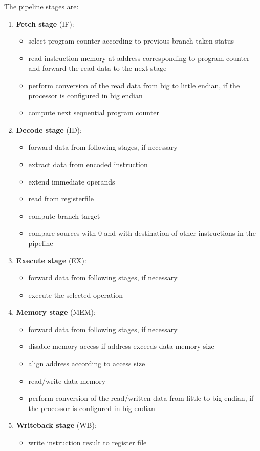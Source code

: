 \bigskip
The pipeline stages are:
\begin{enumerate}
	\item \textbf{Fetch stage} (IF):
		\begin{itemize}
			\item select program counter according to previous branch
				taken status
			\item read instruction memory at address corresponding
				to program counter and forward the read data to
				the next stage
			\item perform conversion of the read data from big to
				little endian, if the processor is configured in
				big endian
			\item compute next sequential program counter
		\end{itemize}
	\item \textbf{Decode stage} (ID):
		\begin{itemize}
			\item forward data from following stages, if necessary
			\item extract data from encoded instruction
			\item extend immediate operands
			\item read from registerfile
			\item compute branch target
			\item compare sources with 0 and with destination of
				other instructions in the pipeline
		\end{itemize}
	\item \textbf{Execute stage} (EX):
		\begin{itemize}
			\item forward data from following stages, if necessary
			\item execute the selected operation
		\end{itemize}
	\item \textbf{Memory stage} (MEM):
		\begin{itemize}
			\item forward data from following stages, if necessary
			\item disable memory access if address exceeds data
				memory size
			\item align address according to access size
			\item read/write data memory
			\item perform conversion of the read/written data from
				little to big endian, if the processor is
				configured in big endian
		\end{itemize}
	\item \textbf{Writeback stage} (WB):
		\begin{itemize}
			\item write instruction result to register file
		\end{itemize}
\end{enumerate}

